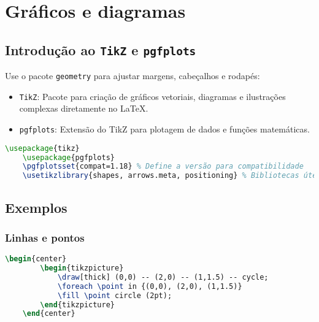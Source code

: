 \chapter{Gráficos e diagramas}



\section{Introdução ao \texttt{TikZ} e \texttt{pgfplots}}

Use o pacote \verb|geometry| para ajustar margens, cabeçalhos e rodapés:

\begin{itemize}
    \item \verb|TikZ|: Pacote para criação de gráficos vetoriais, diagramas e ilustrações complexas diretamente no LaTeX.
    \item \verb|pgfplots|: Extensão do TikZ para plotagem de dados e funções matemáticas.
\end{itemize}   

\begin{lstlisting}[language=tex, caption=Carregue os pacotes essenciais]
    \usepackage{tikz}
    \usepackage{pgfplots}
    \pgfplotsset{compat=1.18} % Define a versão para compatibilidade
    \usetikzlibrary{shapes, arrows.meta, positioning} % Bibliotecas úteis
\end{lstlisting} 

\section{Exemplos}

\subsection{Linhas e pontos}

\begin{lstlisting}[language=tex, caption={Linhas e pontos}]
    \begin{center}
        \begin{tikzpicture}
            \draw[thick] (0,0) -- (2,0) -- (1,1.5) -- cycle;
            \foreach \point in {(0,0), (2,0), (1,1.5)}
            \fill \point circle (2pt);
        \end{tikzpicture}
    \end{center}
\end{lstlisting} 


